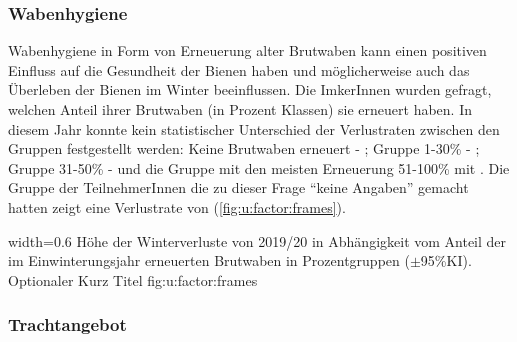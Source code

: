 \subsubsection{Wabenhygiene}
\label{ss:wabenhygiene:U}

Wabenhygiene in Form von Erneuerung alter Brutwaben kann einen positiven Einfluss auf die Gesundheit der Bienen haben und möglicherweise auch das Überleben der Bienen im Winter beeinflussen. Die ImkerInnen wurden gefragt, welchen Anteil ihrer Brutwaben (in Prozent Klassen) sie erneuert haben. In diesem Jahr konnte kein statistischer Unterschied der Verlustraten zwischen den Gruppen festgestellt werden: Keine Brutwaben erneuert - ; Gruppe 1-30\% - ; Gruppe 31-50\% -  und die Gruppe mit den meisten Erneuerung 51-100\% mit . Die Gruppe der TeilnehmerInnen die zu dieser Frage \enquote{keine Angaben} gemacht hatten zeigt eine Verlustrate von  (\cref{fig:u:factor:frames}).

{width=0.6\textwidth} %
{Höhe der Winterverluste von 2019/20 in Abhängigkeit vom Anteil der im Einwinterungsjahr erneuerten Brutwaben in Prozentgruppen ($\pm $95\%KI).} %
{Optionaler Kurz Titel} %
{fig:u:factor:frames} %

\subsubsection{Trachtangebot}
\label{ss:trachtangebot:U}

